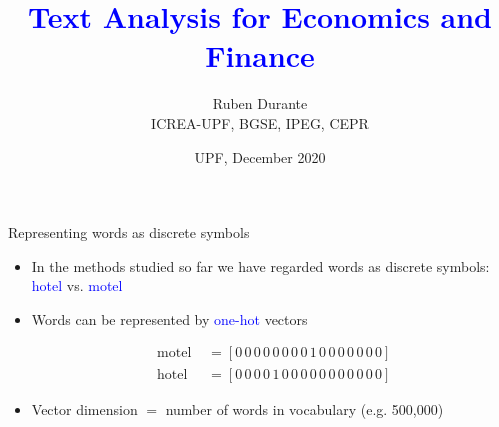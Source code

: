 \documentclass[usenames,dvipsnames,english]{beamer}
\begin{document}
\title{\textcolor{blue}{Text Analysis for Economics and Finance}}
\vspace{8pt} 
\author{Ruben Durante\\
\small{ICREA-UPF, BGSE, IPEG, CEPR}}
\date{\small{UPF, December 2020}}

\frame{\titlepage}

\begin{frame}{Representing words as discrete symbols}
\begin{itemize}
\setlength{\itemsep}{1.5em}

    \item In the methods studied so far we have regarded words as discrete symbols: \textcolor{blue}{hotel} vs. \textcolor{blue}{motel}
    
    \vspace{15pt}
    
    \begin{center}
    \end{center}
    
    \vspace{-20pt}
    
    \item Words can be represented by \textcolor{blue}{one-hot} vectors
    
    \begin{align*}
        \text { motel } &= [0\,0\,0\,0\,0\,0\,0\,0\,1\,0\,0\,0\,0\,0\,0\,0] \\
        \text { hotel } &= [0\,0\,0\,0\,1\,0\,0\,0\,0\,0\,0\,0\,0\,0\,0\,0]
    \end{align*}

    \item Vector dimension $=$ number of words in vocabulary (e.g. 500,000) 
    \end{itemize}
\end{frame}
\end{document}
